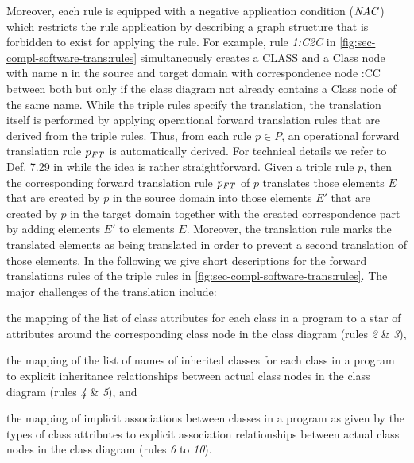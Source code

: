 \begin{example}
Moreover, each rule is equipped with a negative application condition ($\mathit{NAC}$) which restricts the rule application by describing a graph structure that is forbidden to exist for applying the rule.
For example, rule \textit{1:C2C} in \cref{fig:sec-compl-software-trans:rules} simultaneously creates a \textsf{CLASS} and a \textsf{Class} node with name \textsf{n} in the source and target domain with correspondence node \textsf{:CC} between both but only if the class diagram not already contains a \textsf{Class} node of the same name.
While the triple rules specify the translation, the translation itself is performed by applying operational forward translation rules that are derived from the triple rules.
Thus, from each rule $p \in P$, an operational forward translation rule $p_\mathit{FT}$ is automatically derived.
For technical details we refer to Def. 7.29 in \cite{FAGT2} while the idea is rather straightforward.
Given a triple rule $p$, then the corresponding forward translation rule $p_\mathit{FT}$ of $p$ translates those elements $E$ that are created by $p$ in the source domain into those elements $E'$ that are created by $p$ in the target domain together with the created correspondence part by adding elements $E'$ to elements $E$.
Moreover, the translation rule marks the translated elements as being translated in order to prevent a second translation of those elements.
In the following we give short descriptions for the forward translations rules of the triple rules in \cref{fig:sec-compl-software-trans:rules}.
The major challenges of the translation include:
\begin{enumerate*}
  \item the mapping of the list of class attributes for each class in a program to a star of attributes around the corresponding class node in the class diagram (rules \textit{2} \& \textit{3}),
  \item the mapping of the list of names of inherited classes for each class in a program to explicit inheritance relationships between actual class nodes in the class diagram (rules \textit{4} \& \textit{5}), and
  \item the mapping of implicit associations between classes in a program as given by the types of class attributes to explicit association relationships between actual class nodes in the class diagram (rules \textit{6} to \textit{10}).
\end{enumerate*}


\end{example}
